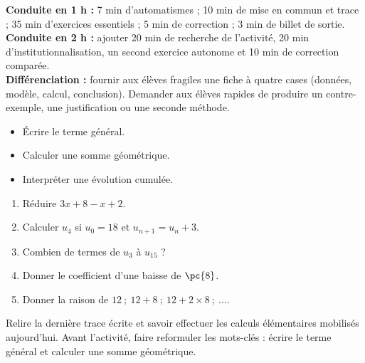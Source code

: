     \ifmxteacher
    \begin{method}
    \textbf{Conduite en 1 h :} 7 min d'automatismes ; 10 min de mise en commun et trace ; 35 min d'exercices essentiels ; 5 min de correction ; 3 min de billet de sortie.\\
    \textbf{Conduite en 2 h :} ajouter 20 min de recherche de l'activité, 20 min d'institutionnalisation, un second exercice autonome et 10 min de correction comparée.\\
    \textbf{Différenciation :} fournir aux élèves fragiles une fiche à quatre cases (données, modèle, calcul, conclusion). Demander aux élèves rapides de produire un contre-exemple, une justification ou une seconde méthode.
    \end{method}
    \fi
{}
\begin{objectives}\begin{itemize}\item Écrire le terme général.\item Calculer une somme géométrique.\item Interpréter une évolution cumulée.\end{itemize}\end{objectives}
\begin{fluency}\begin{enumerate}\item Réduire $3x+8-x+2$. \item Calculer $u_4$ si $u_0=18$ et $u_{n+1}=u_n+3$. \item Combien de termes de $u_3$ à $u_{15}$ ? \item Donner le coefficient d'une baisse de $\pc{8}$. \item Donner la raison de $12\ ;\ 12+8\ ;\ 12+2\times8\ ;\ \ldots$. \end{enumerate}\end{fluency}
\begin{prerequisites}Relire la dernière trace écrite et savoir effectuer les calculs élémentaires mobilisés aujourd'hui. Avant l'activité, faire reformuler les mots-clés : écrire le terme général et calculer une somme géométrique.\end{prerequisites}

